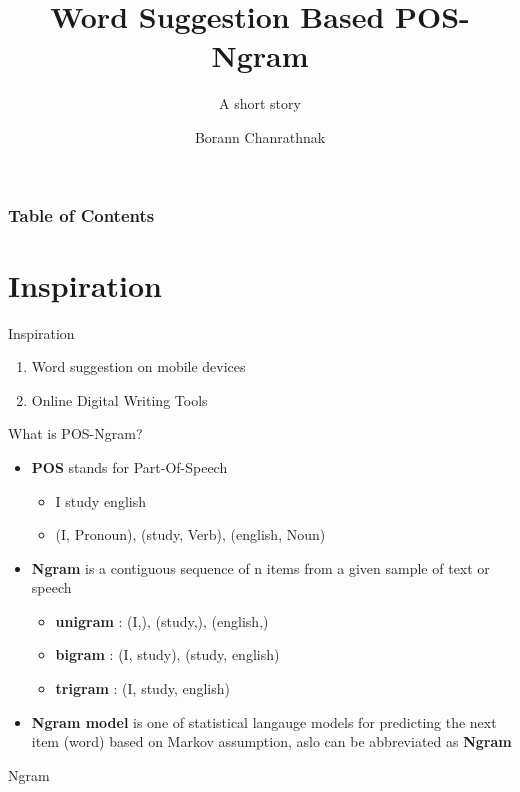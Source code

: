 \documentclass{beamer}
\title{Word Suggestion Based POS-Ngram}
\subtitle{A short story}
\author{Borann Chanrathnak}
\institute{
        Hamana Lab\\
        Gunma University\\
}
\begin{document}
\maketitle


\begin{frame}
\frametitle{Table of Contents}
\tableofcontents
\end{frame}

\section{Inspiration}

\begin{frame}{Inspiration}
\begin{enumerate}
    \item Word suggestion on mobile devices
    \item Online Digital Writing Tools
\end{enumerate}

\end{frame}


\begin{frame}{What is POS-Ngram?}
\begin{itemize}
    \item \textbf{POS} stands for Part-Of-Speech
        \begin{itemize}
            \item I study english
            \item (I, Pronoun), (study, Verb), (english, Noun)
        \end{itemize}
    \item \textbf{Ngram} is a contiguous sequence of n items from a given sample of text or speech
        \begin{itemize}
            \item \textbf{unigram} : (I,), (study,), (english,)
            \item \textbf{bigram} : (I, study), (study, english) 
            \item \textbf{trigram} : (I, study, english)
        \end{itemize}
    \item \textbf{Ngram model} is one of statistical langauge models for predicting the next item (word) based on Markov assumption, aslo can be abbreviated as \textbf{Ngram}
\end{itemize}

\end{frame}

\begin{frame}{Ngram}

\end{frame}
\end{document}
